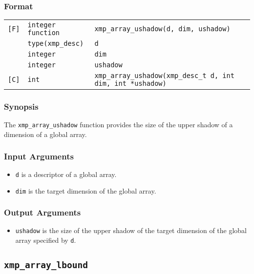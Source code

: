 \subsubsection*{Format}

\begin{tabular}{lll}

\verb![F]!& {\tt integer function}& {\tt xmp\_array\_ushadow(d, dim, ushadow)}\\
          & {\tt type(xmp\_desc)} & {\tt d}\\
          & {\tt integer} & {\tt dim}\\
          & {\tt integer} & {\tt ushadow}\\

\verb![C]!&  {\tt int}& {\tt xmp\_array\_ushadow(xmp\_desc\_t d, int dim, int *ushadow)}\\

\end{tabular}

\subsubsection*{Synopsis}

The {\tt xmp\_array\_ushadow} function provides the size of the upper shadow
of a dimension of a global array.


\subsubsection*{Input Arguments}
\begin{itemize}
 \item {\tt d} is a descriptor of a global array.
 \item {\tt dim} is the target dimension of the global array.
\end{itemize}

\subsubsection*{Output Arguments}
\begin{itemize}
 \item {\tt ushadow} is the size of the upper shadow of the target
       dimension of the global array specified by {\tt d}.
\end{itemize}


\subsection{\tt xmp\_array\_lbound}

